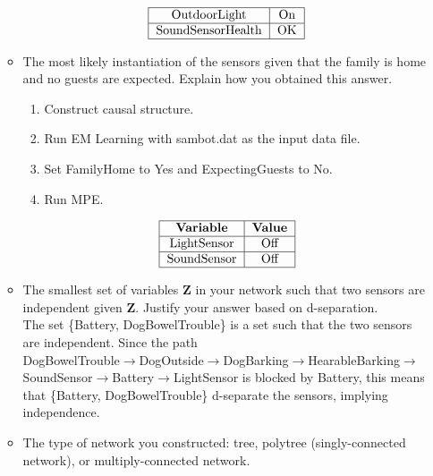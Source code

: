 \documentclass[10.5pt,letterpaper]{article}
\begin{document}
\begin{enumerate}[label=\textbf{Problem \arabic*.}]
\begin{itemize}
\[\begin{tabular} {|c|c|}
		\hline
		OutdoorLight & On \\
		\hline
		SoundSensorHealth & OK \\
		\hline
		\end{tabular}\]
		\item The most likely instantiation of the sensors given that the family is home and no guests are expected. Explain how you obtained this answer.
		\begin{enumerate}[label=\arabic*.]
			\item Construct causal structure.
			\item Run EM Learning with sambot.dat as the input data file.
			\item Set FamilyHome to Yes and ExpectingGuests to No.
			\item Run MPE.
		\end{enumerate}
		\[\begin{tabular} {|c|c|}
		\hline
		\textbf{Variable} & \textbf{Value} \\
		\hline
		LightSensor & Off \\
		\hline
		SoundSensor & Off \\
		\hline
		\end{tabular}\]
		\item The smallest set of variables \textbf{Z} in your network such that two sensors are independent given \textbf{Z}. Justify your answer based on d-separation.\\
		The set \{Battery, DogBowelTrouble\} is a set such that the two sensors are independent. Since the path\\DogBowelTrouble$\rightarrow$DogOutside$\rightarrow$DogBarking$\rightarrow$HearableBarking$\rightarrow$SoundSensor$\rightarrow$Battery$\rightarrow$LightSensor is blocked by Battery, this means that \{Battery, DogBowelTrouble\} d-separate the sensors, implying independence.
		\item The type of network you constructed: tree, polytree (singly-connected network), or multiply-connected network.\\
	\end{itemize} 
\end{enumerate}
\end{document}

